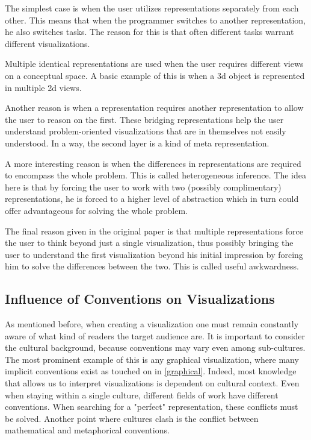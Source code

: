 \documentclass[11pt, a4paper, ngerman, twoside]{article}
\theoremstyle{plain}\newtheorem{Lemma}{Lemma}
\theoremstyle{plain}\newtheorem{Satz}[Lemma]{Satz}
\theoremstyle{definition}\newtheorem{Definition}[Lemma]{Definition}
\theoremstyle{definition}\newtheorem*{Beispiel}{Beispiel}
\theoremstyle{remark}\newtheorem*{Bemerkung}{Bemerkung}
\begin{document}
The simplest case is when the user utilizes representations separately from each other. This means that when the programmer switches to another representation, he also switches tasks. The reason for this is that often different tasks warrant different visualizations.

Multiple identical representations are used when the user requires different views on a conceptual space. A basic example of this is when a 3d object is represented in multiple 2d views.

Another reason is when a representation requires another representation to allow the user to reason on the first. These bridging representations help the user understand problem-oriented visualizations that are in themselves not easily understood. In a way, the second layer is a kind of meta representation.

A more interesting reason is when the differences in representations are required to encompass the whole problem. This is called heterogeneous inference. The idea here is that by forcing the user to work with two (possibly complimentary) representations, he is forced to a higher level of abstraction which in turn could offer advantageous for solving the whole problem.

The final reason given in the original paper is that multiple representations force the user to think beyond just a single visualization, thus possibly bringing the user to understand the first visualization beyond his initial impression by forcing him to solve the differences between the two. This is called useful awkwardness.

\subsection{Influence of Conventions on Visualizations}

As mentioned before, when creating a visualization one must remain constantly aware of what kind of readers the target audience are. It is important to consider the cultural background, because conventions may vary even among sub-cultures. The most prominent example of this is any graphical visualization, where many implicit conventions exist as touched on in \ref{graphical}. Indeed, most knowledge that allows us to interpret visualizations is dependent on cultural context. Even when staying within a single culture, different fields of work have different conventions. When searching for a "perfect" representation, these conflicts must be solved. Another point where cultures clash is the conflict between mathematical and metaphorical conventions.
\end{document}
